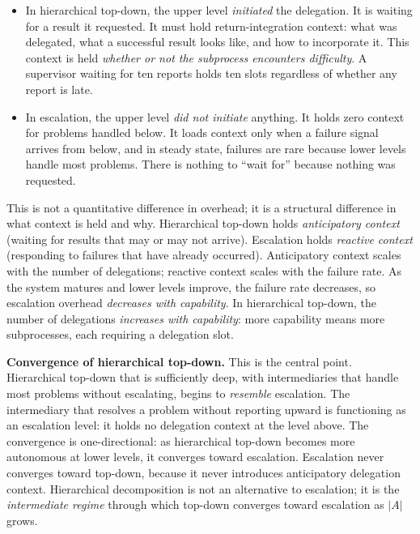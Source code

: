 \documentclass[11pt]{article}
\theoremstyle{definition}
\begin{document}
\begin{itemize}
\item In hierarchical top-down, the upper level \emph{initiated} the
   delegation. It is waiting for a result it requested. It must hold
   return-integration context: what was delegated, what a successful
   result looks like, and how to incorporate it. This context is held
   \emph{whether or not the subprocess encounters difficulty}. A
   supervisor waiting for ten reports holds ten slots regardless of
   whether any report is late.

\item In escalation, the upper level \emph{did not initiate} anything.
   It holds zero context for problems handled below. It loads context
   only when a failure signal arrives from below, and in steady
   state, failures are rare because lower levels handle most problems.
   There is nothing to ``wait for'' because nothing was requested.
\end{itemize}

This is not a quantitative difference in overhead; it is a structural
difference in what context is held and why. Hierarchical top-down holds
\emph{anticipatory context} (waiting for results that may or may not
arrive). Escalation holds \emph{reactive context} (responding to
failures that have already occurred). Anticipatory context scales with
the number of delegations; reactive context scales with the failure rate.
As the system matures and lower levels improve, the failure rate
decreases, so escalation overhead \emph{decreases with capability}. In
hierarchical top-down, the number of delegations \emph{increases with
capability}: more capability means more subprocesses, each requiring a
delegation slot.

\textbf{Convergence of hierarchical top-down.} This is the central
point. Hierarchical top-down that is sufficiently deep, with
intermediaries that handle most problems without escalating, begins to
\emph{resemble} escalation. The intermediary that resolves a problem
without reporting upward is functioning as an escalation level: it
holds no delegation context at the level above. The convergence is
one-directional: as hierarchical top-down becomes more autonomous at
lower levels, it converges toward escalation. Escalation never
converges toward top-down, because it never introduces anticipatory
delegation context. Hierarchical decomposition is not an alternative
to escalation; it is the \emph{intermediate regime} through which
top-down converges toward escalation as $|A|$ grows.
\end{document}
